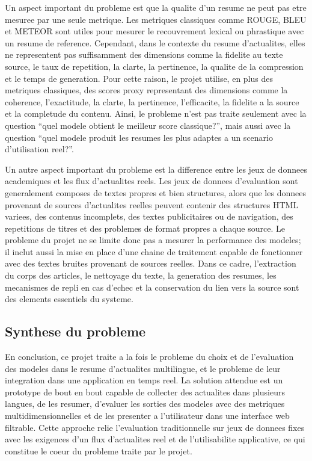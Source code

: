 Un aspect important du probleme est que la qualite d'un resume ne peut pas etre mesuree par une seule metrique. Les metriques classiques comme ROUGE, BLEU et METEOR sont utiles pour mesurer le recouvrement lexical ou phrastique avec un resume de reference. Cependant, dans le contexte du resume d'actualites, elles ne representent pas suffisamment des dimensions comme la fidelite au texte source, le taux de repetition, la clarte, la pertinence, la qualite de la compression et le temps de generation. Pour cette raison, le projet utilise, en plus des metriques classiques, des scores proxy representant des dimensions comme la coherence, l'exactitude, la clarte, la pertinence, l'efficacite, la fidelite a la source et la completude du contenu. Ainsi, le probleme n'est pas traite seulement avec la question ``quel modele obtient le meilleur score classique?'', mais aussi avec la question ``quel modele produit les resumes les plus adaptes a un scenario d'utilisation reel?''.

Un autre aspect important du probleme est la difference entre les jeux de donnees academiques et les flux d'actualites reels. Les jeux de donnees d'evaluation sont generalement composes de textes propres et bien structures, alors que les donnees provenant de sources d'actualites reelles peuvent contenir des structures HTML variees, des contenus incomplets, des textes publicitaires ou de navigation, des repetitions de titres et des problemes de format propres a chaque source. Le probleme du projet ne se limite donc pas a mesurer la performance des modeles; il inclut aussi la mise en place d'une chaine de traitement capable de fonctionner avec des textes bruites provenant de sources reelles. Dans ce cadre, l'extraction du corps des articles, le nettoyage du texte, la generation des resumes, les mecanismes de repli en cas d'echec et la conservation du lien vers la source sont des elements essentiels du systeme.

\subsection{Synthese du probleme}

En conclusion, ce projet traite a la fois le probleme du choix et de l'evaluation des modeles dans le resume d'actualites multilingue, et le probleme de leur integration dans une application en temps reel. La solution attendue est un prototype de bout en bout capable de collecter des actualites dans plusieurs langues, de les resumer, d'evaluer les sorties des modeles avec des metriques multidimensionnelles et de les presenter a l'utilisateur dans une interface web filtrable. Cette approche relie l'evaluation traditionnelle sur jeux de donnees fixes avec les exigences d'un flux d'actualites reel et de l'utilisabilite applicative, ce qui constitue le coeur du probleme traite par le projet.
